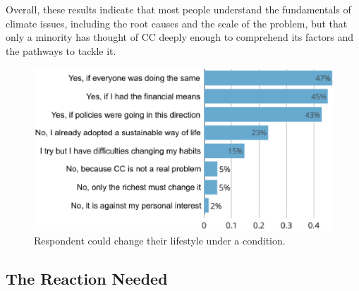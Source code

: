 \documentclass[english,5p,authoryear]{elsarticle}
\begin{document}


Overall, these results indicate that most people understand the fundamentals of climate issues, including the root causes and the scale of the problem, but that only a minority has thought of CC deeply enough to comprehend its factors and the pathways to tackle it.

    

\begin{figure}[t]
\centering
\includegraphics[width=\columnwidth]{Images_EPS/change_if_no.eps}
\caption{Respondent could change their lifestyle under a condition.}
\label{fig:condition}
\end{figure}

    \subsection{The Reaction Needed\label{subsec:reaction}}
\end{document}
